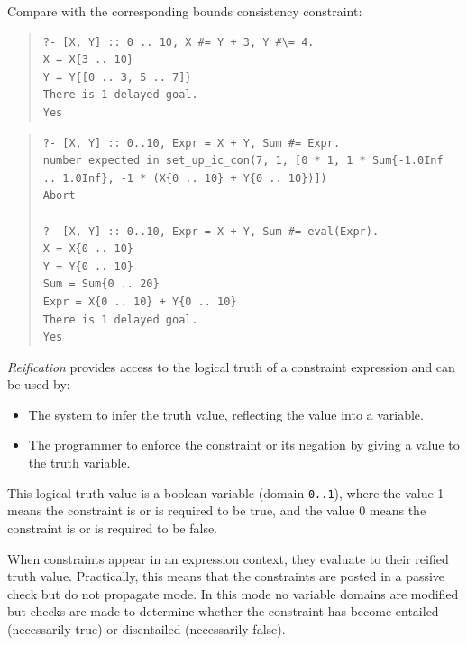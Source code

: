 Compare with the corresponding bounds consistency constraint:

\begin{quote}\begin{verbatim}
?- [X, Y] :: 0 .. 10, X #= Y + 3, Y #\= 4.
X = X{3 .. 10}
Y = Y{[0 .. 3, 5 .. 7]}
There is 1 delayed goal.
Yes
\end{verbatim}\end{quote}



\begin{quote}\begin{verbatim}
?- [X, Y] :: 0..10, Expr = X + Y, Sum #= Expr.
number expected in set_up_ic_con(7, 1, [0 * 1, 1 * Sum{-1.0Inf .. 1.0Inf}, -1 * (X{0 .. 10} + Y{0 .. 10})])
Abort

?- [X, Y] :: 0..10, Expr = X + Y, Sum #= eval(Expr).
X = X{0 .. 10}
Y = Y{0 .. 10}
Sum = Sum{0 .. 20}
Expr = X{0 .. 10} + Y{0 .. 10}
There is 1 delayed goal.
Yes
\end{verbatim}\end{quote}

{\em Reification} provides access to the logical truth of a constraint
expression and can be used by:

\begin{itemize}
\item The {\eclipse} system to infer the truth value, reflecting the value 
into a variable.
\item The programmer to enforce the constraint or its negation by giving a
value to the truth variable.
\end{itemize}

This logical truth value is a boolean variable (domain \texttt{0..1}), where
the value 1 means the constraint is or is required to be true, and the value
0 means the constraint is or is required to be false.

When constraints appear in an expression context, 
they evaluate to their reified truth value. Practically, this means that 
the constraints are posted in a passive check but do not propagate mode.
In this mode no variable domains are modified but checks are made to
determine whether the constraint has become entailed (necessarily true) or 
disentailed (necessarily false).

